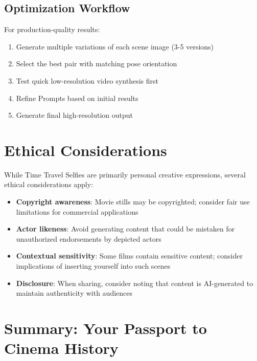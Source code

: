 \subsection{Optimization Workflow}

For production-quality results:

\begin{enumerate}
\item Generate multiple variations of each scene image (3-5 versions)
\item Select the best pair with matching pose orientation
\item Test quick low-resolution video synthesis first
\item Refine Prompts based on initial results
\item Generate final high-resolution output
\end{enumerate}

\section{Ethical Considerations}
\label{sec:ethics-time-travel}

While Time Travel Selfies are primarily personal creative expressions, several ethical considerations apply:

\begin{itemize}
\item \textbf{Copyright awareness}: Movie stills may be copyrighted; consider fair use limitations for commercial applications
\item \textbf{Actor likeness}: Avoid generating content that could be mistaken for unauthorized endorsements by depicted actors
\item \textbf{Contextual sensitivity}: Some films contain sensitive content; consider implications of inserting yourself into such scenes
\item \textbf{Disclosure}: When sharing, consider noting that content is AI-generated to maintain authenticity with audiences
\end{itemize}

\section{Summary: Your Passport to Cinema History}
\label{sec:summary-time-travel}

